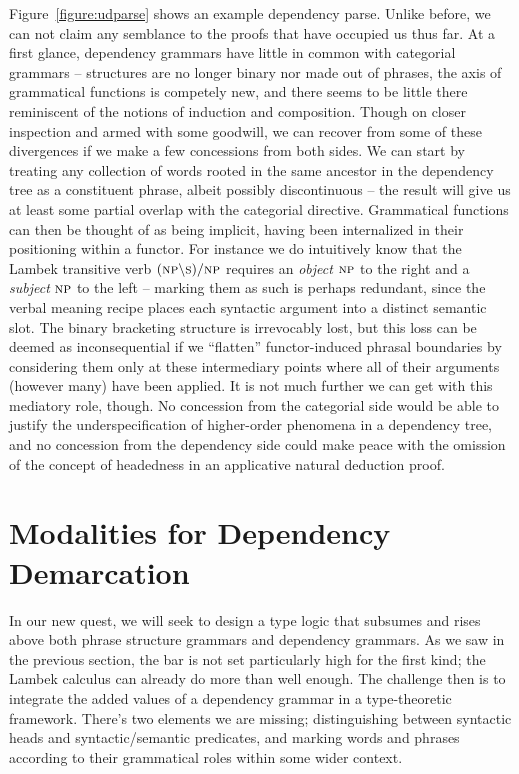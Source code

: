 Figure~\ref{figure:udparse} shows an example dependency parse.
Unlike before, we can not claim any semblance to the proofs that have occupied us thus far.
At a first glance, dependency grammars have little in common with categorial grammars -- structures are no longer binary nor made out of phrases, the axis of grammatical functions is competely new, and there seems to be little there reminiscent of the notions of induction and composition.
Though on closer inspection and armed with some goodwill, we can recover from some of these divergences if we make a few concessions from both sides.
We can start by treating any collection of words rooted in the same ancestor in the dependency tree as a constituent phrase, albeit possibly discontinuous -- the result will give us at least some partial overlap with the categorial directive.
Grammatical functions can then be thought of as being implicit, having been internalized in their positioning within a functor.
For instance we do intuitively know that the Lambek transitive verb $(\np[s]\divleft\s[s])\divright\np[s]$ requires an \textit{object} $\np[s]$ to the right and a \textit{subject} $\np[s]$ to the left -- marking them as such is perhaps redundant, since the verbal meaning recipe places each syntactic argument into a distinct semantic slot.
The binary bracketing structure is irrevocably lost, but this loss can be deemed as inconsequential if we ``flatten'' functor-induced phrasal boundaries by considering them only at these intermediary points where all of their arguments (however many) have been applied.
It is not much further we can get with this mediatory role, though.
No concession from the categorial side would be able to justify the underspecification of higher-order phenomena in a dependency tree,
and no concession from the dependency side could make peace with the omission of the concept of headedness in an applicative natural deduction proof.


\section{Modalities for Dependency Demarcation}
In our new quest, we will seek to design a type logic that subsumes and rises above both phrase structure grammars and dependency grammars.
As we saw in the previous section, the bar is not set particularly high for the first kind; the Lambek calculus can already do more than well enough.
The challenge then is to integrate the added values of a dependency grammar in a type-theoretic framework.
There's two elements we are missing; distinguishing between syntactic heads and syntactic/semantic predicates, and marking words and phrases according to their grammatical roles within some wider context.

